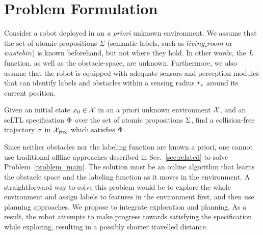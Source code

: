 \section{Problem Formulation}\label{sec:prob}


Consider a robot  deployed in an \emph{a priori} unknown environment. We assume that the set of atomic propositions $\Sigma$ (semantic labels, such as $\mathit{living\_room}$ or $\mathit{wastebin}$) is known beforehand, but not where they hold. In other words, the ${L}$ function, as well as the obstacle-space, are unknown. Furthermore, we also assume that the robot is equipped with adequate sensors and perception modules that can identify labels and obstacles within a sensing radius $r_s$ around its current position.

\begin{problem}
\label{problem_main}
Given an initial state $x_0\in \mathcal{X}$ {in an a priori unknown environment $\mathcal{X}$,} and an scLTL specification $\Phi$ over the set of atomic propositions $\Sigma$, find a collision-free trajectory $\sigma$ in $\mathcal{X}_\mathit{free}$ which satisfies $\Phi$.
\end{problem}

Since neither obstacles nor the labeling function are known a priori, one cannot use traditional offline approaches described in Sec.~\ref{sec:related} to solve Problem~\ref{problem_main}. The solution must be an online algorithm that learns the obstacle space and the labeling function as it moves in the environment. A straightforward way to solve this problem would be to explore the whole environment and assign labels to features in the environment first, and then use planning approaches. We propose to integrate exploration and planning. As a result, the robot attempts to make progress towards satisfying the specification while exploring, resulting in a possibly shorter travelled distance.



